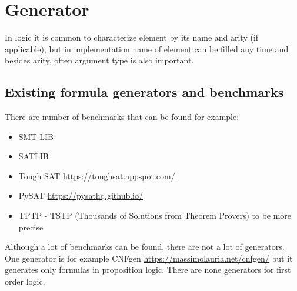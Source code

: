 \chapter{Generator}

In logic it is common to characterize element by its name and arity (if applicable), but in implementation name of element can be filled any time and besides arity, often argument type is also important. 

\section{Existing formula generators and benchmarks}

There are number of benchmarks that can be found for example:

\begin{itemize}
  \item SMT-LIB \cite{BarFT-RR-17} 
  \item SATLIB \cite{Hol00}
  \item Tough SAT \url{https://toughsat.appspot.com/}
  \item PySAT \url{https://pysathq.github.io/}
  \item TPTP \cite{Sut17} - TSTP (Thousands of Solutions from Theorem Provers) to be more precise
\end{itemize}

Although a lot of benchmarks can be found, there are not a lot of generators. One generator is for example CNFgen \url{https://massimolauria.net/cnfgen/} but it generates only formulas in proposition logic. There are none generators for first order logic.

